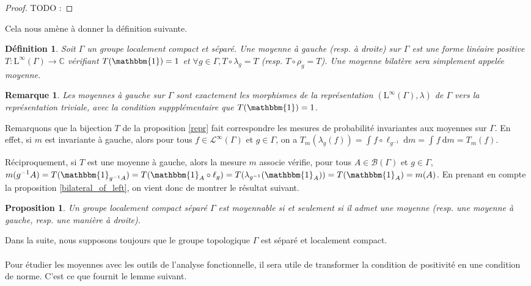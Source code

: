 \documentclass[a4paper,12pt]{article}
\newtheorem{proposition}[theorem]{Proposition}
\newtheorem{definition}[theorem]{Définition}
\newtheorem{remark}[theorem]{Remarque}
\newcommand{\C}{\mathbb{C}}
\newcommand{\Bor}{\mathcal{B}}
\newcommand{\indic}{\mathbbm{1}}
\newcommand{\integral}[4]{\int_{#1}^{#2} #3~\mathrm{d}#4}
\newcommand{\ssi}{si et seulement si }
\newcommand{\inv}{^{-1}}
\newcommand{\comp}{\circ}
\newcommand{\TODO}[1]{{\color{red}TODO :} #1}
\begin{document}
\begin{proof}
    \TODO{}
\end{proof}

Cela nous amène à donner la définition suivante.

\begin{definition}
    Soit $\Gamma$ un groupe localement compact et séparé. Une \emph{moyenne à gauche (resp. à droite)} sur $\Gamma$ est une forme 
    linéaire positive $T : \mathrm{L}^\infty(\Gamma)\to\C$ vérifiant $T(\indic) = 1$ et $\forall g\in\Gamma, T\comp\lambda_g = T$
    (resp. $T\comp\rho_g = T$). Une moyenne bilatère sera simplement appelée \emph{moyenne}.
\end{definition}

\begin{remark}
    Les moyennes à gauche sur $\Gamma$ sont exactement les morphismes de la représentation $(\mathrm{L}^\infty(\Gamma), \lambda)$ de 
    $\Gamma$ vers la représentation triviale, avec la condition suppplémentaire que $T(\indic) = 1$.
\end{remark}

Remarquons que la bijection $T$ de la proposition \ref{repr} fait correspondre les mesures de probabilité 
invariantes aux moyennes sur $\Gamma$. En effet, si $m$ est invariante à gauche, alors pour tous 
$f\in\mathscr{L}^\infty(\Gamma)$ et $g\in\Gamma$, on a 
$T_m(\lambda_g(f)) = \integral{}{}{f\comp\ell_{g\inv}}{m} = \integral{}{}{f}{m} = T_m(f)$. 

Réciproquement, si $T$ est une 
moyenne à gauche, alors la mesure $m$ associe vérifie, pour tous $A\in\Bor(\Gamma)$ et $g\in\Gamma$, 
$m(g\inv A) = T(\indic_{g\inv A}) = T(\indic_A \comp\ell_g) = T(\lambda_{g\inv}(\indic_A)) = T(\indic_A) = m(A)$.
En prenant en compte la proposition \ref{bilateral_of_left}, on vient donc de montrer le résultat suivant.
\begin{proposition}
    Un groupe localement compact séparé $\Gamma$ est moyennable \ssi il admet une moyenne (resp. une moyenne à gauche, resp. une manière à droite).
\end{proposition}

Dans la suite, nous supposons toujours que le groupe topologique $\Gamma$ est séparé et localement compact.
\paragraph{}

Pour étudier les moyennes avec les outils de l'analyse fonctionnelle, il sera utile de transformer la condition de positivité en une condition
de norme. C'est ce que fournit le lemme suivant.
\end{document}
